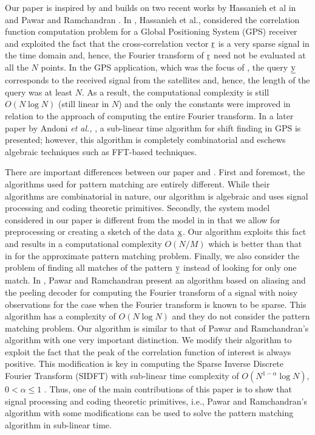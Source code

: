 Our paper is inspired by and builds on two recent works by Hassanieh et al in \cite{hassanieh2012faster} and Pawar and Ramchandran \cite{pawar2014robust}. In \cite{hassanieh2012faster}, Hassanieh et al., considered the correlation function computation problem for a Global Positioning System (GPS) receiver and exploited the fact that the cross-correlation vector $\underline{\mathrm{r}}$ is a very sparse signal in the time domain and, hence, the Fourier transform of $\underline{\mathrm{r}}$ need not be evaluated at all the $N$ points. In the GPS application, which was the focus of \cite{hassanieh2012faster}, the query $\underline{\mathrm{y}}$ corresponds to the received signal from the satellites and, hence, the length of the query was at least $N$. As a result, the computational complexity is still $O(N \log N)$ (still linear in $N$) and the only the constants were improved in relation to the approach of computing the entire Fourier transform. In a later paper by Andoni {\em et al.,} \cite{andoni2013shift}, a sub-linear time algorithm for shift finding in GPS is presented; however, this algorithm is completely combinatorial and eschews algebraic techniques such as FFT-based techniques.

There are important differences between our paper and \cite{hassanieh2012faster,andoni2013shift,boyer1977fast,amir2004faster}. First and foremost, the algorithms used for pattern matching are entirely different. While their algorithms are combinatorial in nature, our algorithm is algebraic and uses signal processing and coding theoretic primitives. Secondly, the system model considered in our paper is different from the model in \cite{hassanieh2012faster,andoni2013shift,boyer1977fast,amir2004faster} in that we allow for preprocessing or creating a sketch of the data $\underline{\mathrm{x}}$. Our algorithm exploits this fact and results in a computational complexity $O(N/M)$ which is better than that in \cite{andoni2013shift} for the approximate pattern matching problem.  Finally, we also consider the problem of finding all matches of the pattern $\underline{\mathrm{y}}$ instead of looking for only one match. In \cite{pawar2014robust}, Pawar and Ramchandran present an algorithm based on aliasing and the peeling decoder for computing the Fourier transform of a signal with noisy observations for the case when the Fourier transform is known to be sparse. This algorithm has a complexity of $O(N \log N)$ and they do not consider the pattern matching problem. Our algorithm is similar to that of Pawar and Ramchandran's algorithm with one very important distinction. We modify their algorithm to exploit the fact that the peak of the correlation function of interest is always positive. This modification is key in computing the Sparse Inverse Discrete Fourier Transform (SIDFT) with sub-linear time complexity of $O(N^{1-\alpha} \log N)$, $0 < \alpha \leq 1$ . Thus, one of the main contributions of this paper is to show that signal processing and coding theoretic primitives, i.e., Pawar and Ramchandran's algorithm with some modifications can be used to solve the pattern matching algorithm in sub-linear time. 